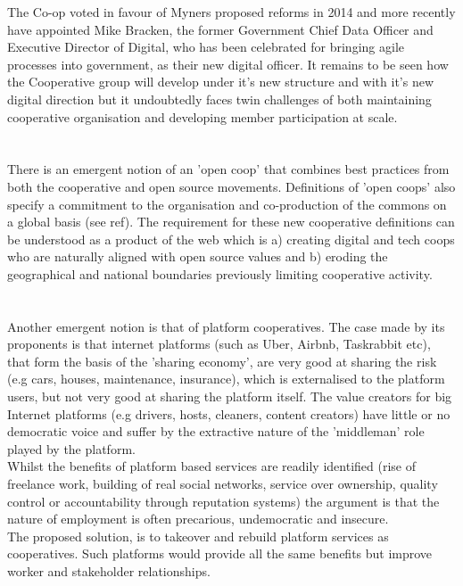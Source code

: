 The Co-op voted in favour of Myners proposed reforms in 2014 and more recently have appointed Mike Bracken, the former Government Chief Data Officer and Executive Director of Digital, who has been celebrated for bringing agile processes into government\cite{AgileGov}, as their new digital officer\cite{bracken}. It remains to be seen how the Cooperative group will develop under it's new structure and with it's new digital direction but it undoubtedly faces twin challenges of both maintaining cooperative organisation and developing member participation at scale.\\
\\
\\
There is an emergent notion of an 'open coop' that combines best practices from both the cooperative and open source movements\cite{OpenCoop}. Definitions of 'open coops' also specify a commitment to the organisation and co-production of the commons on a global basis (see ref). The requirement for these new cooperative definitions can be understood as a product of the web which is a) creating digital and tech coops who are naturally aligned with open source values and b) eroding the geographical and national boundaries previously limiting cooperative activity.\\
\\
\\
Another emergent notion is that of platform cooperatives\cite{PlatformCoop}. The case made by its proponents\cite{TreborPC} is that internet platforms (such as Uber, Airbnb, Taskrabbit etc), that form the basis of the 'sharing economy', are very good at sharing the risk (e.g cars, houses, maintenance, insurance), which is externalised to the platform users, but not very good at sharing the platform itself. The value creators for big Internet platforms (e.g drivers, hosts, cleaners, content creators) have little or no democratic voice and suffer by the extractive nature of the 'middleman' role played by the platform.\\

Whilst the benefits of platform based services are readily identified\cite{TreborPC} (rise of freelance work, building of real social networks, service over ownership, quality control or accountability through reputation systems) the argument is that the nature of employment is often precarious, undemocratic and insecure. \\

The proposed solution, is to takeover and rebuild platform services as cooperatives. Such platforms would provide all the same benefits but improve worker and stakeholder relationships.\\
 
